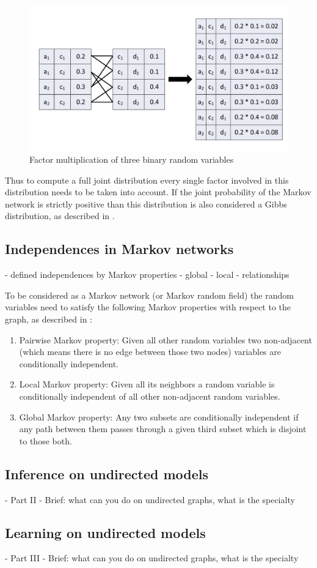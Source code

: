 \begin{figure}[htpb]
  \centering
  	\includegraphics[scale=0.4]{img/parammult.pdf} 
  \caption{Factor multiplication of three binary random variables}
  \label{fig:parammult}
\end{figure}

Thus to compute a full joint distribution every single factor involved in this distribution needs to be taken into account. If the joint probability of the Markov network is strictly positive than this distribution is also considered a Gibbs distribution, as described in \cite{kindermann1980markov}.

\subsection{Independences in Markov networks}

- defined independences by Markov properties
- global
- local
- relationships

To be considered as a Markov network (or Markov random field) the random variables need to satisfy the following Markov properties with respect to the graph, as described in \cite{markov1957theory}:

\begin{enumerate}
\item Pairwise Markov property: Given all other random variables two non-adjacent (which means there is no edge between those two nodes) variables are conditionally independent.
\item Local Markov property: Given all its neighbors a random variable is conditionally independent of all other non-adjacent random variables.
\item Global Markov property: Any two subsets are conditionally independent if any path between them passes through a given third subset which is disjoint to those both.  
\end{enumerate}


\subsection{Inference on undirected models}

- Part II
- Brief: what can you do on undirected graphs, what is the specialty

\subsection{Learning on undirected models}

- Part III
- Brief: what can you do on undirected graphs, what is the specialty
